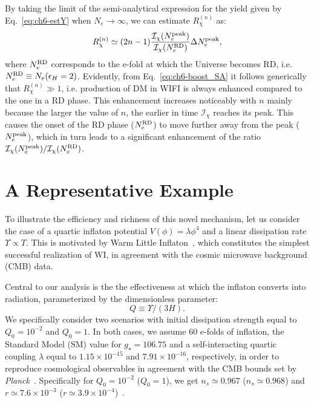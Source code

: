 By taking the limit of the semi-analytical expression for the yield given by Eq.~\eqref{eq:ch6-estY} when $N_e\rightarrow\infty$, we can estimate $R^{(n)}_{\chi}$ as:
\begin{eqnarray}
    R_\chi^{(n)}\simeq (2n-1) \frac{\mathcal{I}_\chi (N_e^{\rm{peak}})}{\mathcal{I}_\chi (N_e^{\rm{RD}})}\Delta N_e^{\rm{peak}}, \label{eq:ch6-boost_SA}
\end{eqnarray}
where $N_e^{\rm{RD}}$ corresponds to the e-fold at which the Universe becomes RD, i.e. $N_e^{\rm{RD}}\equiv N_e(\epsilon_H=2)$.
Evidently, from Eq.~\eqref{eq:ch6-boost_SA} it follows generically that $R_\chi^{(n)}\gg 1$, i.e. production of DM in WIFI is always enhanced compared to the one in a RD phase. This enhancement increases noticeably with $n$ mainly because the larger the value of $n$, the earlier in time $\mathcal{I}_\chi$ reaches its peak. This causes the onset of the RD phase ($N_e^{\rm{RD}}$) to move further away from the peak ($N_e^{\rm{peak}}$), which in turn leads to a significant enhancement of the ratio $\mathcal{I}_\chi (N_e^{\rm{peak}})/\mathcal{I}_\chi (N_e^{\rm{RD}})$.

\section{A Representative Example}
\label{sec:ch6-example}

To illustrate the efficiency and richness of this novel mechanism, let us consider the case of a quartic inflaton potential $V(\phi)=\lambda \phi^4$ and a linear dissipation rate $\Upsilon\propto T$. This is motivated by
 Warm Little Inflaton~\cite{Bastero-Gil:2016qru, Bastero-Gil:2019gao}, which constitutes the simplest successful realization of WI, in agreement with the cosmic microwave background (CMB) data.

 Central to our analysis is the the effectiveness at which the inflaton converts into radiation, parameterized by the dimensionless parameter:
\begin{equation}
    Q\equiv \Upsilon/(3H).
\end{equation}
 We specifically consider two
 scenarios with initial dissipation strength  equal to $Q_0=10^{-2}$ and $Q_0=1$. In both cases, we assume 60 e-folds of inflation, the Standard Model (SM) value for $g_\star=106.75$ and a self-interacting quartic coupling $\lambda$ equal to $1.15\times10^{-15}$ and $7.91\times10^{-16}$, respectively, in order to reproduce cosmological observables in agreement with the CMB bounds set by \textit{Planck}~\cite{Planck:2018jri}. Specifically for $Q_0=10^{-2}$ ($Q_0=1$), we get  $n_s\simeq0.967$ ($n_s\simeq 0.968$) and $r\simeq7.6\times 10^{-3}$ ($r\simeq3.9\times 10^{-4}$)~\cite{Montefalcone:2023pvh}.

